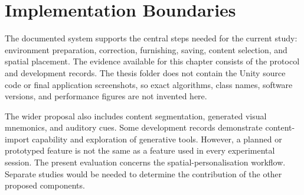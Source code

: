 \section{Implementation Boundaries}
The documented system supports the central steps needed for the current study: environment preparation, correction, furnishing, saving, content selection, and spatial placement. The evidence available for this chapter consists of the protocol and development records. The thesis folder does not contain the Unity source code or final application screenshots, so exact algorithms, class names, software versions, and performance figures are not invented here.

The wider proposal also includes content segmentation, generated visual mnemonics, and auditory cues. Some development records demonstrate content-import capability and exploration of generative tools. However, a planned or prototyped feature is not the same as a feature used in every experimental session. The present evaluation concerns the spatial-personalisation workflow. Separate studies would be needed to determine the contribution of the other proposed components.

